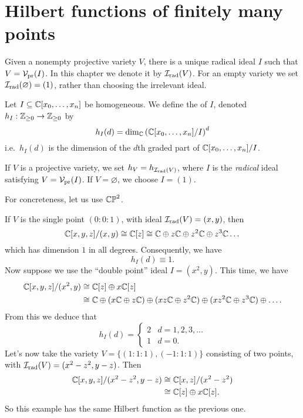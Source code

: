 \section{Hilbert functions of finitely many points}
\begin{definition}
	Given a nonempty projective variety $V$, there is a unique
	radical ideal $I$ such that $V = \mathcal V_{\text{pr}}(I)$.
	In this chapter we denote it by $\mathcal I_{\text{rad}}(V)$.
	For an empty variety we set $\mathcal I_{\text{rad}}(\varnothing) = (1)$,
	rather than choosing the irrelevant ideal.
\end{definition}
\begin{definition}
	Let $I \subseteq \mathbb C[x_0, \dots, x_n]$ be homogeneous.
	We define the  of $I$,
	denoted $h_I : \mathbb Z_{\ge 0} \to \mathbb Z_{\ge 0}$ by
	\[ h_I(d) = \dim_{\mathbb C} \left( \mathbb C[x_0, \dots, x_n]/I \right)^d \]
	i.e.\ $h_I(d)$ is the dimension of the $d$th graded part of
	$\mathbb C[x_0, \dots, x_n] / I$.
\end{definition}
\begin{definition}
	If $V$ is a projective variety, we set $h_V = h_{\mathcal I_{\text{rad}}(V)}$,
	where $I$ is the \emph{radical} ideal satisfying $V = \mathcal V_{\text{pr}}(I)$.
	If $V = \varnothing$, we choose $I = (1)$.
\end{definition}
\begin{example}
	\label{ex:hilbert_zero}
	For concreteness, let us use $\mathbb{CP}^2$.
	\begin{enumerate}[(a)]
		\ii If $V$ is the single point $(0:0:1)$,
		with ideal $\mathcal I_{\text{rad}}(V) = (x,y)$,
		then 
		\[ \mathbb C[x,y,z] / (x,y) \cong \mathbb C[z]
		\cong \mathbb C \oplus z\mathbb C \oplus z^2\mathbb C \oplus z^3\mathbb C \dots \]
		which has dimension $1$ in all degrees.
		Consequently, we have \[ h_I(d) \equiv 1. \]
		\ii Now suppose we use the ``double point'' ideal $I = (x^2,y)$.
		This time, we have
		\begin{align*}
			\mathbb C[x,y,z] / (x^2,y)
			&\cong \mathbb C[z] \oplus x\mathbb C[z] \\
			&\cong \mathbb C \oplus (x\mathbb C \oplus z\mathbb C) \oplus (xz\mathbb C \oplus z^2\mathbb C)
			\oplus (xz^2\mathbb C \oplus z^3\mathbb C) \oplus\dots.
		\end{align*}
		From this we deduce that
		\[
			h_I(d) =
			\begin{cases}
				2 & d = 1, 2, 3, \dots \\
				1 & d = 0.
			\end{cases}
		\]
		\ii Let's now take the variety $V = \{(1:1:1), (-1:1:1)\}$
		consisting of two points, with $\mathcal I_{\text{rad}}(V) = (x^2-z^2, y-z)$. Then
		\begin{align*}
			\mathbb C[x,y,z] / (x^2-z^2,y-z)
			&\cong \mathbb C[x,z] / (x^2-z^2) \\
			&\cong \mathbb C[z] \oplus x\mathbb C[z].
		\end{align*}
		So this example has the same Hilbert function as the previous one.
	\end{enumerate}
\end{example}
